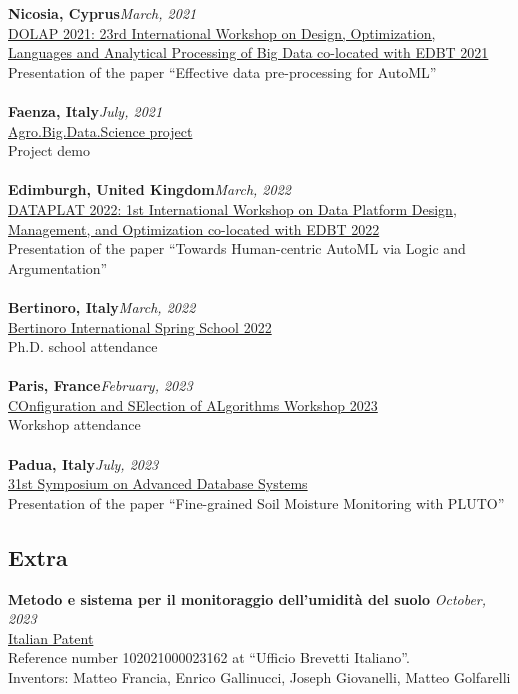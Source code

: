 \textbf{Nicosia, Cyprus}\hfill \textit{March, 2021}\\
\underline{DOLAP 2021: 23rd International Workshop on Design, Optimization,}\\
\underline{Languages and Analytical Processing of Big Data co-located with EDBT 2021}\\
Presentation of the paper ``Effective data pre-processing for AutoML''\\
\\
\textbf{Faenza, Italy}\hfill \textit{July, 2021}\\
\underline{Agro.Big.Data.Science project}\\
Project demo\\
\\
\textbf{Edimburgh, United Kingdom}\hfill \textit{March, 2022}\\
\underline{DATAPLAT 2022: 1st International Workshop on Data Platform Design,}\\
\underline{Management, and Optimization co-located with EDBT 2022}\\
Presentation of the paper ``Towards Human-centric AutoML via Logic and Argumentation''\\
\\
\textbf{Bertinoro, Italy}\hfill \textit{March, 2022}\\
\underline{Bertinoro International Spring School 2022}\\
Ph.D. school attendance\\
\\
\textbf{Paris, France}\hfill \textit{February, 2023}\\
\underline{COnfiguration and SElection of ALgorithms Workshop 2023}\\
Workshop attendance\\
\\
\textbf{Padua, Italy}\hfill \textit{July, 2023}\\
\underline{31st Symposium on Advanced Database Systems}\\
Presentation of the paper ``Fine-grained Soil Moisture Monitoring with PLUTO''\\


\subsection*{Extra}
\textbf{Metodo e sistema per il monitoraggio dell'umidità del suolo} \hfill \textit{October, 2023}\\
\underline{Italian Patent}\\
Reference number 102021000023162 at ``Ufficio Brevetti Italiano''.\\
Inventors: Matteo Francia, Enrico Gallinucci, Joseph Giovanelli, Matteo Golfarelli
